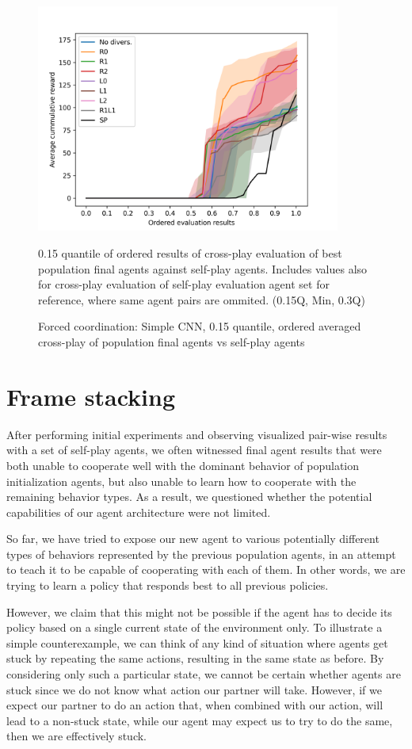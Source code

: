 \begin{figure}[!ht]
    \centering
    \includegraphics*[width=10cm]{../img/SimpleCNNOrderedAvg0.15Q.png}

    \caption{Forced coordination: Simple CNN, 0.15 quantile, ordered averaged cross-play of population final agents vs self-play agents}
    \label{SimpleCNNOrderedAvg0.15Q}
    \medskip
    \small 
    0.15 quantile of ordered results of cross-play evaluation of best population final agents against self-play agents.
    Includes values also for cross-play evaluation of self-play evaluation agent set for reference, where same agent pairs are ommited.
    (0.15Q, Min, 0.3Q)

\end{figure}

\newpage


\section{Frame stacking}
After performing initial experiments and observing visualized pair-wise results with a set of self-play agents, we often witnessed final agent results that were both unable to cooperate well with the dominant behavior of population initialization agents, but also unable to learn how to cooperate with the remaining behavior types.
As a result, we questioned whether the potential capabilities of our agent architecture were not limited.

So far, we have tried to expose our new agent to various potentially different types of behaviors represented by the previous population agents, in an attempt to teach it to be capable of cooperating with each of them.
In other words, we are trying to learn a policy that responds best to all previous policies.

However, we claim that this might not be possible if the agent has to decide its policy based on a single current state of the environment only.
To illustrate a simple counterexample, we can think of any kind of situation where agents get stuck by repeating the same actions, resulting in the same state as before.
By considering only such a particular state, we cannot be certain whether agents are stuck since we do not know what action our partner will take.
However, if we expect our partner to do an action that, when combined with our action, will lead to a non-stuck state, while our agent may expect us to try to do the same, then we are effectively stuck.

